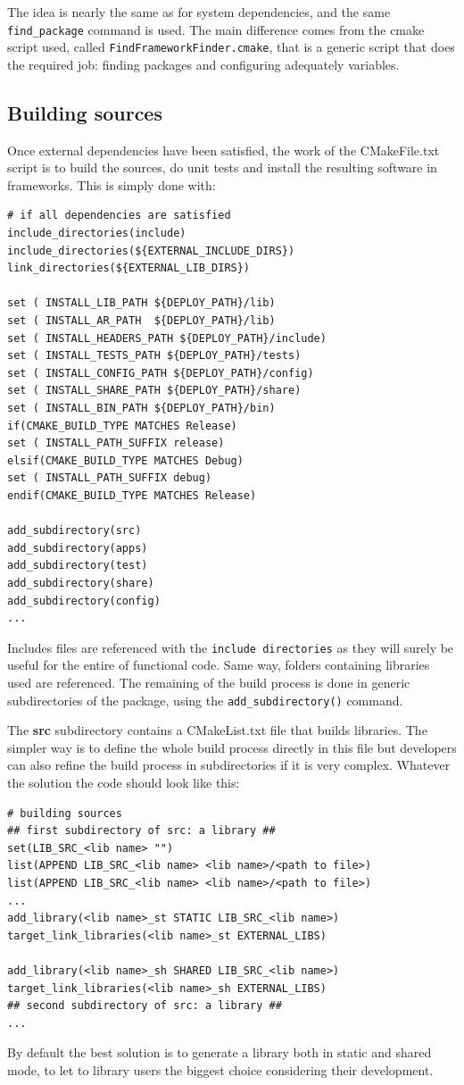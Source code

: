 \documentclass[12pt,a4paper]{article}
\begin{document}
The idea is nearly the same as for system dependencies, and the same \verb|find_package| command is used. The main difference comes from the cmake script used, called \texttt{FindFrameworkFinder.cmake}, that is a generic script that does the required job: finding packages and configuring adequately variables. 

\subsection{Building sources}

Once external dependencies have been satisfied, the work of the CMakeFile.txt script is to build the sources, do unit tests and install the resulting software in frameworks. This is simply done with:
\begin{verbatim}
# if all dependencies are satisfied
include_directories(include)
include_directories(${EXTERNAL_INCLUDE_DIRS})
link_directories(${EXTERNAL_LIB_DIRS})

set ( INSTALL_LIB_PATH ${DEPLOY_PATH}/lib)
set ( INSTALL_AR_PATH  ${DEPLOY_PATH}/lib)
set ( INSTALL_HEADERS_PATH ${DEPLOY_PATH}/include)
set ( INSTALL_TESTS_PATH ${DEPLOY_PATH}/tests)
set ( INSTALL_CONFIG_PATH ${DEPLOY_PATH}/config)
set ( INSTALL_SHARE_PATH ${DEPLOY_PATH}/share)
set ( INSTALL_BIN_PATH ${DEPLOY_PATH}/bin)
if(CMAKE_BUILD_TYPE MATCHES Release)
set ( INSTALL_PATH_SUFFIX release)
elsif(CMAKE_BUILD_TYPE MATCHES Debug)
set ( INSTALL_PATH_SUFFIX debug)
endif(CMAKE_BUILD_TYPE MATCHES Release)

add_subdirectory(src)
add_subdirectory(apps)
add_subdirectory(test)
add_subdirectory(share)
add_subdirectory(config)
...
\end{verbatim}

Includes files are referenced with the \texttt{include directories} as they will surely be useful for the entire of functional code. Same way, folders containing libraries used are referenced. The remaining of the build process is done in generic subdirectories of the package, using the \texttt{add\_subdirectory()} command.

The \textbf{src} subdirectory contains a CMakeList.txt file that builds libraries. The simpler way is to define the whole build process directly in this file but developers can also refine the build process in subdirectories if it is very complex. Whatever the solution the code should look like this:
\begin{verbatim}
# building sources
## first subdirectory of src: a library ##
set(LIB_SRC_<lib name> "")
list(APPEND LIB_SRC_<lib name> <lib name>/<path to file>)
list(APPEND LIB_SRC_<lib name> <lib name>/<path to file>)
...
add_library(<lib name>_st STATIC LIB_SRC_<lib name>)
target_link_libraries(<lib name>_st EXTERNAL_LIBS)

add_library(<lib name>_sh SHARED LIB_SRC_<lib name>)
target_link_libraries(<lib name>_sh EXTERNAL_LIBS)
## second subdirectory of src: a library ##
...
\end{verbatim}
By default the best solution is to generate a library both in static and shared mode, to let to library users the biggest choice considering their development.
\end{document}
